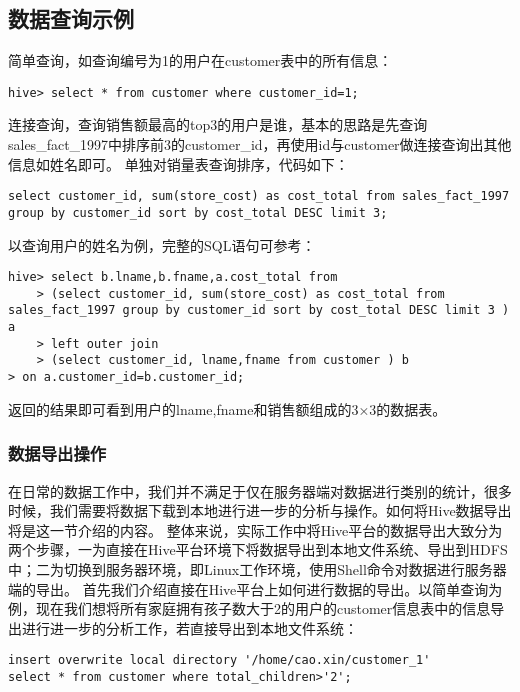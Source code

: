 \subsection{数据查询示例}\label{ux6570ux636eux67e5ux8be2ux793aux4f8b}

简单查询，如查询编号为1的用户在customer表中的所有信息：

\begin{lstlisting}
hive> select * from customer where customer_id=1;
\end{lstlisting}

连接查询，查询销售额最高的top3的用户是谁，基本的思路是先查询sales\_fact\_1997中排序前3的customer\_id，再使用id与customer做连接查询出其他信息如姓名即可。
单独对销量表查询排序，代码如下：

\begin{lstlisting}
select customer_id, sum(store_cost) as cost_total from sales_fact_1997 group by customer_id sort by cost_total DESC limit 3;
\end{lstlisting}

以查询用户的姓名为例，完整的SQL语句可参考：

\begin{lstlisting}
hive> select b.lname,b.fname,a.cost_total from
    > (select customer_id, sum(store_cost) as cost_total from sales_fact_1997 group by customer_id sort by cost_total DESC limit 3 ) a
    > left outer join
    > (select customer_id, lname,fname from customer ) b
> on a.customer_id=b.customer_id;
\end{lstlisting}

返回的结果即可看到用户的lname,fname和销售额组成的3×3的数据表。

\subsubsection{数据导出操作}\label{ux6570ux636eux5bfcux51faux64cdux4f5c}

在日常的数据工作中，我们并不满足于仅在服务器端对数据进行类别的统计，很多时候，我们需要将数据下载到本地进行进一步的分析与操作。如何将Hive数据导出将是这一节介绍的内容。
整体来说，实际工作中将Hive平台的数据导出大致分为两个步骤，一为直接在Hive平台环境下将数据导出到本地文件系统、导出到HDFS中；二为切换到服务器环境，即Linux工作环境，使用Shell命令对数据进行服务器端的导出。
首先我们介绍直接在Hive平台上如何进行数据的导出。以简单查询为例，现在我们想将所有家庭拥有孩子数大于2的用户的customer信息表中的信息导出进行进一步的分析工作，若直接导出到本地文件系统：

\begin{lstlisting}
insert overwrite local directory '/home/cao.xin/customer_1'
select * from customer where total_children>'2';
\end{lstlisting}

